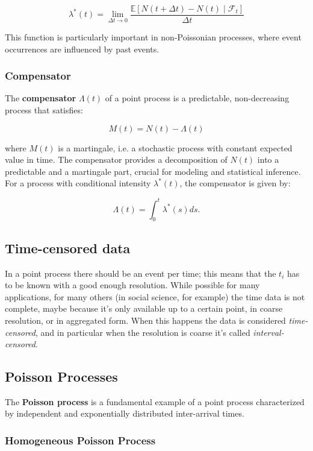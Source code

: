 \documentclass[11pt]{article}
\begin{document}
\[
  \lambda^*(t) = \lim_{\Delta t \to 0} \frac{\mathbb{E}[N(t+\Delta t) - N(t) \mid \mathcal{F}_t]}{\Delta t}
\]

This function is particularly important in non-Poissonian processes, where event occurrences are influenced by past events.

\subsubsection{Compensator}

The \textbf{compensator} $\Lambda(t)$ of a point process is a predictable, non-decreasing process that satisfies:

\[
  M(t) = N(t) - \Lambda(t)
\]

where $M(t)$ is a martingale, i.e. a stochastic process with constant expected value in time. The compensator provides a decomposition of $N(t)$ into a predictable and a martingale part, crucial for modeling and statistical inference. For a process with conditional intensity $\lambda^*(t)$, the compensator is given by:

\[
  \Lambda(t) = \int_0^t \lambda^*(s) ds.
\]

\subsection{Time-censored data}

In a point process there should be an event per time; this means that the $t_i$ has to be known with a good enough resolution. While possible for many applications, for many others (in social science, for example) the time data is not complete, maybe because it's only available up to a certain point, in coarse resolution, or in aggregated form. When this happens the data is considered \textit{time-censored}, and in particular when the resolution is coarse it's called \textit{interval-censored}.

\subsection{Poisson Processes}

The \textbf{Poisson process} is a fundamental example of a point process characterized by independent and exponentially distributed inter-arrival times.

\subsubsection{Homogeneous Poisson Process}
\end{document}
